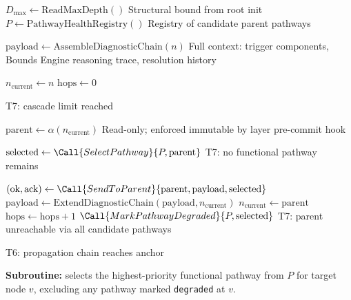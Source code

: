 \begin{algorithm}[t]
\caption{Escalation Algorithm}
\label{alg:escalation}
\begin{algorithmic}[1]
  \State $D_{\max} \gets \text{ReadMaxDepth}()$          \Comment Structural bound from root init
  \State $P \gets \text{PathwayHealthRegistry}()$      \Comment Registry of candidate parent pathways

  \State $\text{payload} \gets \text{AssembleDiagnosticChain}(n)$
  \Comment Full context: trigger components, Bounds Engine reasoning trace, resolution history

  \State $n_{\text{current}} \gets n$
  \State $\text{hops} \gets 0$

      \State \Return {}
      \Comment T7: cascade limit reached
    \EndIf

    \State $\text{parent} \gets \alpha(n_{\text{current}})$
    \Comment Read-only; enforced immutable by \fact{} layer pre-commit hook

    \State $\text{selected} \gets \Call{SelectPathway}{P, \text{parent}}$
      \State \Return {}
      \Comment T7: no functional pathway remains
    \EndIf

    \State $(\text{ok}, \text{ack}) \gets \Call{SendToParent}{\text{parent}, \text{payload}, \text{selected}}$
      \State $\text{payload} \gets \text{ExtendDiagnosticChain}(\text{payload}, n_{\text{current}})$
      \State $n_{\text{current}} \gets \text{parent}$
      \State $\text{hops} \gets \text{hops} + 1$
    \Else
      \State $\Call{MarkPathwayDegraded}{P, \text{selected}}$
      \State \Return {}
      \Comment T7: parent unreachable via all candidate pathways
    \EndIf
  \EndWhile

  \State {}
  \State \Return {}
  \Comment T6: propagation chain reaches anchor
\EndFunction

\State \textbf{Subroutine:}  selects the highest-priority functional
\State {}pathway from $P$ for target node $v$, excluding any pathway
\State {}marked \texttt{degraded} at $v$.
\end{algorithmic}
\end{algorithm}

